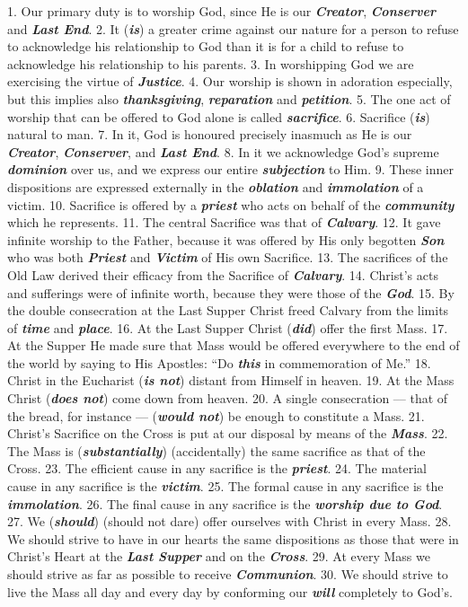 \documentclass[a5paper]{article}
\newcommand\answer[1]{\textbf{\textit{#1}}}
\begin{document}
1. Our primary duty is to worship God, since He is  our  \answer{Creator},  \answer{Conserver}
and \answer{Last End}. 
2. It (\answer{is}) a greater crime against our nature  for  a
person to refuse to acknowledge his relationship to God than  it  is  for  a
child to refuse to acknowledge  his  relationship  to  his  parents.  
3.  In
worshipping God we are exercising the virtue of \answer{Justice}. 
4. Our worship  is
shown in adoration especially, but this implies also \answer{thanksgiving}, \answer{reparation}  and
\answer{petition}. 
5. The one act of worship that can be  offered  to  God  alone  is
called \answer{sacrifice}. 
6. Sacrifice (\answer{is}) natural to man. 
7.  In  it,  God
is honoured  precisely  inasmuch  as  He  is  our  \answer{Creator},  \answer{Conserver},  and
\answer{Last End}. 
8. In it we acknowledge God's supreme \answer{dominion}  over  us,  and  we
express our  entire  \answer{subjection}  to  Him.  
9.  These  inner  dispositions  are
expressed  externally  in  the  \answer{oblation}  and  \answer{immolation}  of  a  victim.  
10.
Sacrifice is offered by a \answer{priest} who acts on behalf of the \answer{community}  which
he represents. 
11. The central Sacrifice was that of \answer{Calvary}. 
12.  It  gave
infinite worship to the Father, because it was offered by His only  begotten
\answer{Son} who was both \answer{Priest} and \answer{Victim} of His own  Sacrifice.  
13.  The
sacrifices of the Old Law derived  their  efficacy  from  the  Sacrifice  of
\answer{Calvary}. 
14. Christ's acts and sufferings were of infinite  worth,  because
they were those of the \answer{God}. 
15. By the double consecration at the  Last
Supper Christ freed Calvary from the limits of \answer{time}  and  \answer{place}.  
16.
At the Last Supper Christ (\answer{did}) offer the first Mass. 
17.  At  the
Supper He made sure that Mass would be offered everywhere to the end of  the
world by saying to His Apostles: “Do \answer{this} in commemoration of  Me.”  
18.
Christ in the Eucharist (\answer{is not}) distant from Himself  in  heaven.  
19.
At the Mass Christ (\answer{does not}) come down from  heaven.  
20.  A  single
consecration --– that of the bread, for instance  ---  (\answer{would  not})  be
enough to constitute a Mass. 
21. Christ's Sacrifice on the Cross is  put  at
our disposal by means of the  \answer{Mass}.  
22.  The  Mass  is  (\answer{substantially})
(accidentally) the same sacrifice as that of the Cross.  
23.  The  efficient
cause in any sacrifice is the  \answer{priest}.  
24.  The  material  cause  in  any
sacrifice is the \answer{victim}. 
25. The formal cause  in  any  sacrifice  is  the
\answer{immolation}. 
26. The final cause in any  sacrifice  is  the  \answer{worship due to God}.  
27.  We
(\answer{should}) (should not dare) offer ourselves with Christ in  every  Mass.  
28. We should strive to have in our hearts the same dispositions as  those  that
were in Christ's Heart at the \answer{Last Supper} and on the  \answer{Cross}.  
29.  At  every
Mass we should strive as far as possible to receive \answer{Communion}. 
30. We  should
strive to live the Mass all day and every day  by  conforming  our  \answer{will}
completely to God's.
\end{document}
